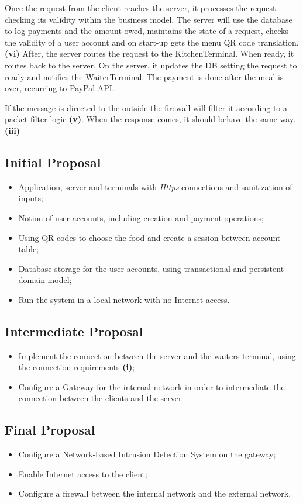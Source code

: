 \documentclass[12pt,paper=a4]{article}
\begin{document}
Once the request from the client reaches the server, it processes the request checking its validity within the business model. The server will use the database to log payments and the amount owed, maintains the state of a request, checks the validity of a user account and on start-up gets the menu QR code translation. \textbf{(vi)} After, the server routes the request to the KitchenTerminal. When ready, it routes back to the server. On the server, it updates the DB setting the request to ready and notifies the WaiterTerminal. The payment is done after the meal is over, recurring to PayPal API.

If the message is directed to the outside the firewall will filter it according to a packet-filter logic \textbf{(v)}. When the response comes, it should behave the same way. \textbf{(iii)}

\subsection{Initial Proposal}
\begin{itemize}
\item[\ding{51}] Application, server and terminals with \textit{Https} connections and sanitization of inputs;
\item[\ding{51}] Notion of user accounts, including creation and payment operations;
\item[\ding{51}] Using QR codes to choose the food and create a session between account-table;
\item[\ding{51}] Database storage for the user accounts, using transactional and persistent domain model;
\item[\ding{51}] Run the system in a local network with no Internet access.
\end{itemize}

\subsection{Intermediate Proposal}
\begin{itemize}
\item[\ding{51}] Implement the connection between the server and the waiters terminal, using the connection requirements \textbf{(i)};
\item[\ding{51}] Configure a Gateway for the internal network in order to intermediate the connection between the clients and the server.
\end{itemize}

\subsection{Final Proposal}
\begin{itemize}
\item[\ding{51}] Configure a Network-based Intrusion Detection System on the gateway;
\item[\ding{51}] Enable Internet access to the client;
\item[\ding{51}] Configure a firewall between the internal network and the external network.
\end{itemize}
\end{document}
